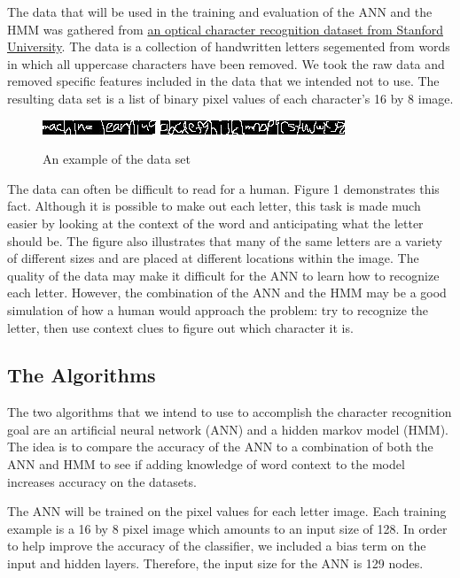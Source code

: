 \documentclass[11pt,a4paper,twocolumn]{article}
\begin{document}
The data that will be used in the training and evaluation of the ANN and the HMM was gathered from
\href{http://ai.stanford.edu/~btaskar/ocr/}{an optical character recognition dataset from Stanford University}. The data is a collection of handwritten letters segemented from words in which all uppercase characters have been removed. We took the raw data and removed specific features included in the data that we intended not to use. The resulting data set is a list of binary pixel values of each character's 16 by 8 image.
\begin{figure}[h]
\centering
\includegraphics{img/ml.jpg}
\includegraphics{img/alphabet.jpg}
\caption{An example of the data set}
\end{figure}

The data can often be difficult to read for a human. Figure 1 demonstrates this fact. Although it is possible to make out each letter, this task is made much easier by looking at the context of the word and anticipating what the letter should be. The figure also illustrates that many of the same letters are a variety of different sizes and are placed at different locations within the image. The quality of the data may make it difficult for the ANN to learn how to recognize each letter. However, the combination of the ANN and the HMM may be a good simulation of how a human would approach the problem: try to recognize the letter, then use context clues to figure out which character it is.

\subsection*{The Algorithms}

The two algorithms that we intend to use to accomplish the character recognition goal are an artificial neural network (ANN) and a hidden markov model (HMM). The idea is to compare the accuracy of the ANN to a combination of both the ANN and HMM to see if adding knowledge of word context to the model increases accuracy on the datasets.

The ANN will be trained on the pixel values for each letter image. Each training example is a 16 by 8 pixel image which amounts to an input size of 128. In order to help improve the accuracy of the classifier, we included a bias term on the input and hidden layers. Therefore, the input size for the ANN is 129 nodes.
\end{document}
